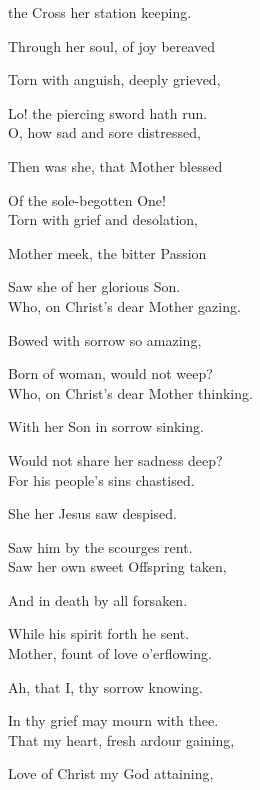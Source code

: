 \begin{multicols}{2}
 the Cross her station keeping.



Through her soul, of joy bereaved

Torn with anguish, deeply grieved,

Lo! the piercing sword hath run.\\

O, how sad and sore distressed,

Then was she, that Mother blessed

Of the sole-begotten One!\\

Torn with grief and desolation,

Mother meek, the bitter Passion

Saw she of her glorious Son.\\


Who, on Christ's dear Mother gazing.

Bowed with sorrow so amazing,

Born of woman, would not weep?\\

Who, on Christ's dear Mother thinking.

With her Son in sorrow sinking.

Would not share her sadness deep?\\

For his people's sins chastised.

She her Jesus saw despised.

Saw him by the scourges rent.\\

Saw her own sweet Offspring taken,

And in death by all forsaken.

While his spirit forth he sent.\\

Mother, fount of love o'erflowing.

Ah, that I, thy sorrow knowing.

In thy grief may mourn with thee.\\

That my heart, fresh ardour gaining,

Love of Christ my God attaining,


\end{multicols}
